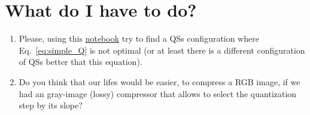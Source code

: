 \begin{comment}
Thus, the optimal QSs should
operate in the curves with the same RD slope,
\begin{equation}
  \lambda_{\text{R}} = \lambda_{\text{G}} = \lambda_{\text{B}},
  \label{eq:optimal_quantization}
\end{equation}
for a given total bit-rate $R$, which implies that the contribution of
each component (the ratio between quality and bit-rate) to the quality
of $\tilde{x}$ has been highest
possible~\cite{vetterli1995wavelets,sayood2017introduction}.

Unfortunately, the previous procedure implies the computation of the
RD curve for each component, which is a time-consuming operation. For
this reason, and supposing that the statistics of each component are
similar and therefore, each component is going to generate a RD curve
with the same slopes for the same QSs, we can suppose that
Eq.~\ref{eq:simple_Q} satisfies Eq.~\ref{eq:optimal_quantization}.
\end{comment}

\section{What do I have to do?}
\begin{enumerate}
\item Please, using this
  \href{https://github.com/Sistemas-Multimedia/Sistemas-Multimedia.github.io/blob/master/milestones/05-RGB_quantization/RGB_quantization.ipynb}{notebook}
  try to find a QSs configuration where Eq.~\ref{eq:simple_Q} is not
  optimal (or at least there is a different configuration of QSs
  better that this equation).
\item Do you think that our lifes would be easier, to compress a RGB
  image, if we had an gray-image (lossy) compressor that allows to
  select the quantization step by its slope?
\end{enumerate}

